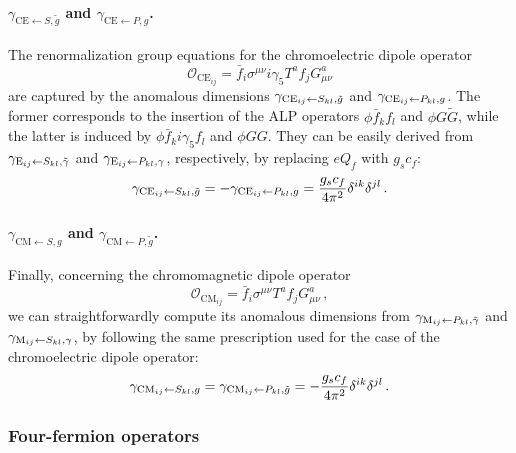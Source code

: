 \paragraph{$\gamma_{\text{CE}\leftarrow S,\tilde g}$ and $\gamma_{\text{CE}\leftarrow P, g}$.}
The renormalization group equations for the chromoelectric dipole operator
\begin{equation}
    \mathcal O_{\text{CE}_{ij}} = \bar f_i \sigma^{\mu\nu}i\gamma_5 T^a f_j G_{\mu\nu}^a
\end{equation}
are captured by the anomalous dimensions $\gamma_{\textup{CE}_{ij}\leftarrow S_{kl},\tilde g}$ and $\gamma_{\textup{CE}_{ij}\leftarrow P_{kl}, g}$.
The former corresponds to the insertion of the ALP operators $\phi \bar f_k f_l$ and $\phi G\tilde G$, while the latter is induced by $\phi \bar f_k i \gamma_5 f_l$ and $\phi G G$.
They can be easily derived from $\gamma_{\textup{E}_{ij}\leftarrow S_{kl},\tilde \gamma}$ and $\gamma_{\textup{E}_{ij}\leftarrow P_{kl}, \gamma}$, respectively, by replacing $eQ_f$ with $g_s c_f$:
\begin{equation}
    \gamma_{\textup{CE}_{ij}\leftarrow S_{kl},\tilde g} =- \gamma_{\textup{CE}_{ij}\leftarrow P_{kl}, g}=  \frac{g_sc_f }{4\pi^2}\delta^{ik}\delta^{jl}\,.
\end{equation}

\paragraph{$\gamma_{\text{CM}\leftarrow S, g}$ and $\gamma_{\text{CM}\leftarrow P,\tilde g}$.}
Finally, concerning the chromomagnetic dipole operator
\begin{equation}
    \mathcal O_{\text{CM}_{ij}} = \bar f_i \sigma^{\mu\nu} T^a f_j G_{\mu\nu}^a\,,
\end{equation}
we can straightforwardly compute its anomalous dimensions from $\gamma_{\textup{M}_{ij}\leftarrow P_{kl},\tilde\gamma}$ and $\gamma_{\textup{M}_{ij}\leftarrow S_{kl},\gamma}$, by following the same prescription used for the case of the chromoelectric dipole operator:
\begin{equation}
    \gamma_{\textup{CM}_{ij}\leftarrow S_{kl}, g}=\gamma_{\textup{CM}_{ij}\leftarrow P_{kl},\tilde g}= -\frac{g_sc_f }{4\pi^2}\delta^{ik}\delta^{jl}\,.
\end{equation}

\subsubsection{Four-fermion operators}

